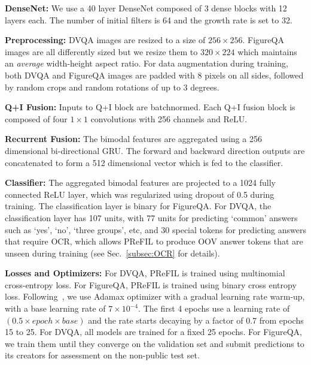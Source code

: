 \documentclass[10pt,twocolumn]{article}
\begin{document}
\textbf{DenseNet:} We use a 40 layer DenseNet composed of 3 dense blocks with 12 layers each. The number of initial filters is 64 and the growth rate is set to 32.

\textbf{Preprocessing:} DVQA images are resized to a size of $256\times 256$. FigureQA images are all differently sized but we resize them to $320\times 224$ which maintains an \textit{average} width-height aspect ratio. For data augmentation during training, both DVQA and FigureQA images are padded with 8 pixels  on all sides, followed by random crops and random rotations of up to 3 degrees.

\textbf{Q+I Fusion:} Inputs to Q+I block are batchnormed. Each Q+I fusion block is composed of four $1\times1$ convolutions with 256 channels and ReLU. 

\textbf{Recurrent Fusion:} The bimodal features are aggregated using a 256 dimensional bi-directional GRU. The forward and backward direction outputs are concatenated to form a 512 dimensional vector which is fed to the classifier.

\textbf{Classifier:} The aggregated bimodal features are projected to a 1024 fully connected ReLU layer, which was regularized using  dropout of 0.5 during training. The classification layer is binary for FigureQA. For DVQA, the classification layer has 107 units,  with 77 units for predicting `common' answers such as `yes', `no', `three groups', etc, and 30 special tokens for predicting answers that require OCR, which allows PReFIL to produce OOV answer tokens that are unseen during training (see Sec.~\ref{subsec:OCR} for details).

\textbf{Losses and Optimizers:} For DVQA, PReFIL is trained using multinomial cross-entropy loss. For FigureQA, PReFIL is trained using binary cross entropy loss. Following~\cite{kim2018bilinear}, we use Adamax optimizer with a gradual learning rate warm-up, with a base learning rate of $7\times 10^{-4}$. The first 4 epochs use a learning rate of $(0.5\times epoch\times base)$ and the rate starts decaying by a factor of 0.7 from epochs 15 to 25. For DVQA, all models are trained for a fixed 25 epochs. For FigureQA, we train them until they converge on the validation set and submit predictions to its creators for assessment on the non-public test set.
\end{document}
